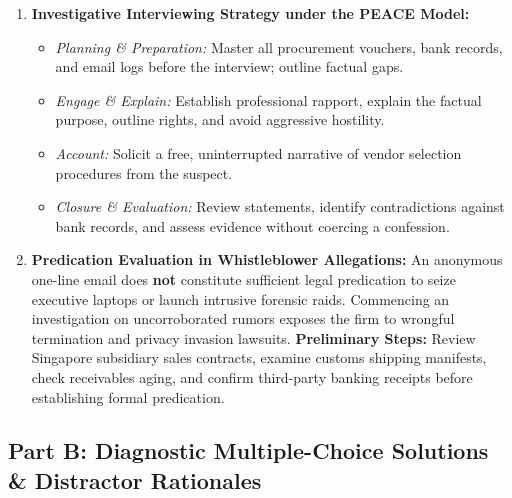 \begin{enumerate}[label=\textbf{P4.\arabic*}]
    \item \textbf{Investigative Interviewing Strategy under the PEACE Model:}
    \begin{itemize}
        \item \textit{Planning \& Preparation:} Master all procurement vouchers, bank records, and email logs before the interview; outline factual gaps.
        \item \textit{Engage \& Explain:} Establish professional rapport, explain the factual purpose, outline rights, and avoid aggressive hostility.
        \item \textit{Account:} Solicit a free, uninterrupted narrative of vendor selection procedures from the suspect.
        \item \textit{Closure \& Evaluation:} Review statements, identify contradictions against bank records, and assess evidence without coercing a confession.
    \end{itemize}

    \item \textbf{Predication Evaluation in Whistleblower Allegations:}
    An anonymous one-line email does \textbf{not} constitute sufficient legal predication to seize executive laptops or launch intrusive forensic raids. Commencing an investigation on uncorroborated rumors exposes the firm to wrongful termination and privacy invasion lawsuits. 
    \textbf{Preliminary Steps:} Review Singapore subsidiary sales contracts, examine customs shipping manifests, check receivables aging, and confirm third-party banking receipts before establishing formal predication.
\end{enumerate}

\subsection*{Part B: Diagnostic Multiple-Choice Solutions \& Distractor Rationales}


